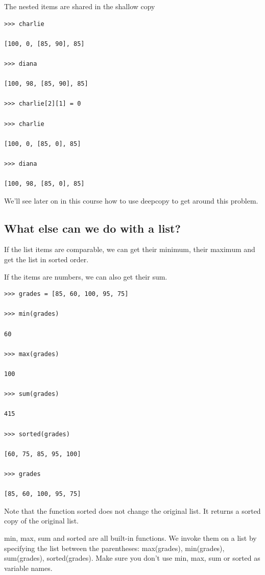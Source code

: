 \documentclass{article}
\begin{document}
The nested items are shared in the shallow copy

\begin{lstlisting}
>>> charlie

[100, 0, [85, 90], 85]

>>> diana

[100, 98, [85, 90], 85]

>>> charlie[2][1] = 0

>>> charlie

[100, 0, [85, 0], 85]

>>> diana

[100, 98, [85, 0], 85]

\end{lstlisting}

We'll see later on in this course how to use deepcopy to get around this problem.

\subsection{What else can we do with a list?}

If the list items are comparable, we can get their minimum, their maximum and get the list in sorted order.

If the items are numbers, we can also get their sum.

\begin{lstlisting}
>>> grades = [85, 60, 100, 95, 75]

>>> min(grades)

60

>>> max(grades)

100

>>> sum(grades)

415

>>> sorted(grades)

[60, 75, 85, 95, 100]

>>> grades

[85, 60, 100, 95, 75]

\end{lstlisting}

Note that the function sorted does not change the original list.  It returns a sorted copy of the original list.

min, max, sum and sorted are all built-in functions.  We invoke them on a list by specifying the list between the parentheses:  max(grades), min(grades), sum(grades), sorted(grades). Make sure you don't use min, max, sum or sorted as variable names.
\end{document}
